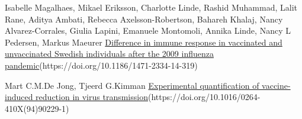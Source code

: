\documentclass[10pt]{article}
\begin{document}
\begin{thebibliography}{9}
Isabelle Magalhaes, Mikael Eriksson, Charlotte Linde, Rashid Muhammad, Lalit Rane, Aditya Ambati, Rebecca Axelsson-Robertson, Bahareh Khalaj, Nancy Alvarez-Corrales, Giulia Lapini, Emanuele Montomoli, Annika Linde, Nancy L Pedersen, Markus Maeurer
\href{https://doi.org/10.1186/1471-2334-14-319}{Difference in immune response in vaccinated and unvaccinated Swedish individuals after the 2009 influenza pandemic}(https://doi.org/10.1186/1471-2334-14-319)

Mart C.M.De Jong, Tjeerd G.Kimman
\href{https://doi.org/10.1016/0264-410X(94)90229-1}{Experimental quantification of vaccine-induced reduction in virus transmission}(https://doi.org/10.1016/0264-410X(94)90229-1)
\end{thebibliography}
\end{document}

